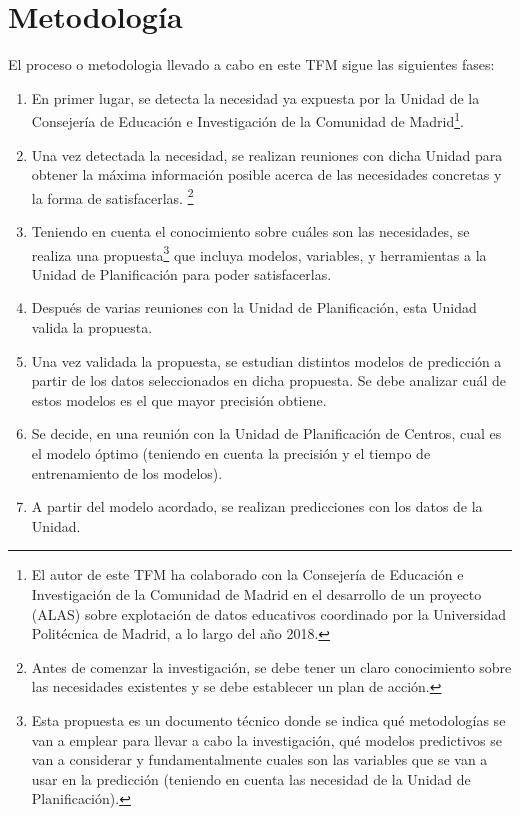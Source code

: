\section{Metodología}
El proceso o metodologia llevado a cabo en este TFM sigue las siguientes fases:
\begin{enumerate}
	\item En primer lugar, se detecta la necesidad ya expuesta por la Unidad de la Consejería de Educación e Investigación de la Comunidad de Madrid\footnote{El autor de este TFM ha colaborado con la Consejería de Educación e Investigación de la Comunidad de Madrid en el desarrollo de un proyecto (ALAS) sobre explotación de datos educativos coordinado por la Universidad Politécnica de Madrid, a lo largo del año 2018.}.
	\item Una vez detectada la necesidad, se realizan reuniones con dicha Unidad para obtener la máxima información posible acerca de las necesidades concretas y la forma de satisfacerlas. \footnote{Antes de comenzar la investigación, se debe tener un claro conocimiento sobre las necesidades existentes y se debe establecer un plan de acción.}
	\item Teniendo en cuenta el conocimiento sobre cuáles son las necesidades, se realiza una propuesta\footnote{Esta propuesta es un documento técnico donde se indica qué metodologías se van a emplear para llevar a cabo la investigación, qué modelos predictivos se van a considerar y fundamentalmente cuales son las variables que se van a usar en la predicción (teniendo en cuenta las necesidad de la Unidad de Planificación).} que incluya modelos, variables, y herramientas a la Unidad de Planificación para poder satisfacerlas.%
	\item Después de varias reuniones con la Unidad de Planificación, esta Unidad valida la propuesta.
	\item Una vez validada la propuesta, se estudian distintos modelos de predicción a partir de los datos seleccionados en dicha propuesta. Se debe analizar cuál de estos modelos es el que mayor precisión obtiene.
	\item Se decide, en una reunión con la Unidad de Planificación de Centros, cual es el modelo óptimo (teniendo en cuenta la precisión y el tiempo de entrenamiento de los modelos). 
	\item A partir del modelo acordado, se realizan predicciones con los datos de la Unidad.
\end{enumerate}

